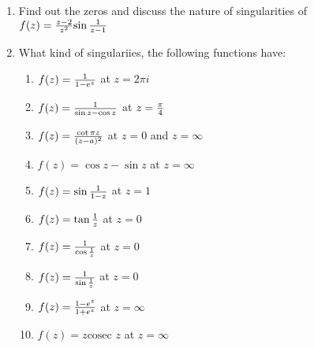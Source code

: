 \begin{enumerate}
	\item Find out the zeros and discuss the nature of singularities of $f(z)={z-2 \over z^2}{\sin{1 \over z-1}}$
	\item What kind  of singulariies, the following functions have:
									\begin{enumerate}
										\item $f(z)={1 \over 1-e^z}$ at $z=2\pi i$
										\item $f(z)={1 \over \sin z - \cos z}$  at $z={\pi\over 4}$
										\item $f(z)={\cot \pi z \over (z-a)^2}$  at $z=0$ and $z= \infty$
										\item $f(z)={\cos z - \sin z}$ at $z=\infty$
										\item $f(z)={\sin{1 \over 1-z}}$ at $z=1$
										\item $f(z)={\tan{1 \over z}}$ at $z=0$
										\item $f(z)={1 \over \cos{1 \over z}}$ at $z=0$
										\item $f(z)={1 \over \sin{1 \over z}}$ at $z=0$
										\item $f(z)={1-e^z \over 1 + e^z}$ at $z=\infty$
										\item $f(z)={z \text{cosec } z}$ at $z=\infty$
										
									\end{enumerate}
		

\end{enumerate}
